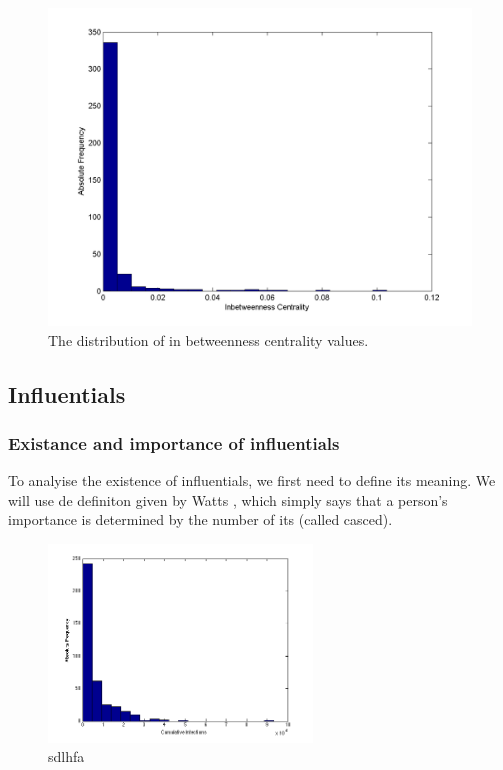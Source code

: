 \begin{figure}[H!]
\includegraphics[scale=0.4]{network_centralityhist.png}
\caption{The distribution of in betweenness centrality values.}
\label{centrality}
\end{figure}



\subsection{Influentials}


\subsubsection{Existance and importance of influentials}


To analyise the existence of influentials, we first need to define its meaning. We will use de definiton given by Watts \cite{influentials}, which simply says that a person's importance is determined by the number of its  (called casced).

\begin{figure}[H!]
\includegraphics[width=7cm]{influ2}
\caption{sdlhfa}
\label{Histo}
\end{figure}

